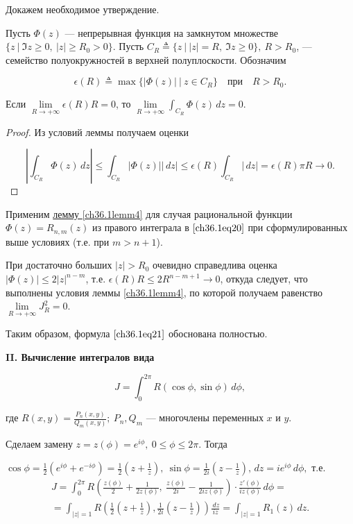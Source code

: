 Докажем необходимое утверждение.

\begin{lemm} \label{ch36.1lemm4}
Пусть $\Phi(z)$ --- непрерывная функция на замкнутом множестве $\{ z \: \big| \: \Im z \ge 0, \: |z| \ge R_0 > 0 \}$. Пусть $C_R \triangleq \{ z \: \big| \: |z| = R, \: \Im z \ge 0 \}, \: R > R_0$, --- семейство полуокружностей в верхней полуплоскости. Обозначим

$$
\epsilon(R) \triangleq \max\{|\Phi(z)| \: \big| \: z\in C_R \} \quad \text{при} \quad R > R_0.
$$

Если $\lim\limits_{R \to +\infty} \epsilon(R)R = 0$, то $\lim\limits_{R \to +\infty} \int_{C_R} \Phi(z)\,dz = 0$.
\end{lemm}

\begin{proof}
Из условий леммы получаем оценки

$$
\left| \int_{C_R} \Phi(z)\,dz \right| \le \int_{C_R} |\Phi(z)||\,dz| \le \epsilon(R) \int_{C_R}|\,dz| = \epsilon(R)\pi R \to 0.
$$

\end{proof}

Применим \hyperref[ch36.1lemm4]{лемму \ref{ch36.1lemm4}} для случая рациональной функции $\Phi(z) = R_{n,m}(z)$ из правого интеграла в $\eqref{ch36.1eq20}$ при сформулированных выше условиях (т.е. при $m > n + 1$).

При достаточно больших $|z| > R_0$ очевидно справедлива оценка $|\Phi(z)| \le 2|z|^{n - m}$, т.е.
$\epsilon(R)R \le 2R^{n - m + 1} \to 0$, откуда следует, что выполнены условия леммы \ref{ch36.1lemm4}, по которой получаем равенство $\lim\limits_{R \to +\infty} J_R^2 = 0$.

Таким образом, формула $\eqref{ch36.1eq21}$ обоснована полностью.

{\bf II. Вычисление интегралов вида}

\begin{equation} \label{ch36.1eq22}
J = \int_{0}^{2\pi} R(\cos \phi, \sin\phi)\,d\phi,
\end{equation}

где $R(x,y) = \frac{P_n(x,y)}{Q_m(x,y)}; \: P_n, Q_m$ --- многочлены переменных $x$ и $y$.

Сделаем замену $z = z(\phi) = e^{i \phi}, \: 0 \le \phi \le 2\pi$. Тогда 

$\cos\phi = \frac{1}{2} (e^{i\phi} + e^{-i\phi}) = \frac{1}{2}\left( z + \frac{1}{z}\right), \: \sin\phi = \frac{1}{2i} \left(z - \frac{1}{z} \right), \,dz = i e^{i \phi} \,d\phi,$ т.е. 
\begin{multline*}
J = \int_0^{2\pi} R\left( \frac{z(\phi)}{2} + \frac{1}{2z(\phi)}, \: \frac{z(\phi)}{2i} - \frac{1}{2iz(\phi)}\right) \cdot \frac{z'(\phi)}{iz(\phi)} \,d\phi =\\= \int_{|z| = 1} R\left( \frac{1}{2} \left( z + \frac{1}{z}\right), \frac{1}{2i}\left( z - \frac{1}{z}\right)\right)\frac{\,dz}{iz} = \int_{|z| = 1} R_1(z)\,dz.
\end{multline*}

